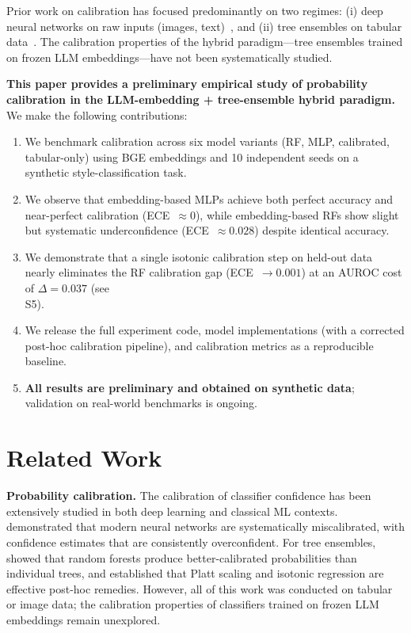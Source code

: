 \documentclass[11pt]{article}
\begin{document}
Prior work on calibration has focused predominantly on two regimes: (i) deep neural networks on raw inputs (images, text)~\cite{guo2017calibration}, and (ii) tree ensembles on tabular data~\cite{niculescu2005predicting,bostrom2008calibration}. The calibration properties of the hybrid paradigm---tree ensembles trained on frozen LLM embeddings---have not been systematically studied.

\textbf{This paper provides a preliminary empirical study of probability calibration in the LLM-embedding + tree-ensemble hybrid paradigm.} We make the following contributions:

\begin{enumerate}[leftmargin=*,nosep]
 \item We benchmark calibration across six model variants (RF, MLP, calibrated, tabular-only) using BGE embeddings and 10 independent seeds on a synthetic style-classification task.
 \item We observe that embedding-based MLPs achieve both perfect accuracy and near-perfect calibration (ECE~${\approx}0$), while embedding-based RFs show slight but systematic underconfidence (ECE~${\approx}0.028$) despite identical accuracy.
 \item We demonstrate that a single isotonic calibration step on held-out data nearly eliminates the RF calibration gap (ECE~${\rightarrow}0.001$) at an AUROC cost of $\Delta = 0.037$ (see \\S5).
 \item We release the full experiment code, model implementations (with a corrected post-hoc calibration pipeline), and calibration metrics as a reproducible baseline.
 \item \textbf{All results are preliminary and obtained on synthetic data}; validation on real-world benchmarks is ongoing.
\end{enumerate}

\section{Related Work}

\textbf{Probability calibration.} The calibration of classifier confidence has been extensively studied in both deep learning and classical ML contexts. \citet{guo2017calibration} demonstrated that modern neural networks are systematically miscalibrated, with confidence estimates that are consistently overconfident. For tree ensembles, \citet{niculescu2005predicting} showed that random forests produce better-calibrated probabilities than individual trees, and \citet{bostrom2008calibration} established that Platt scaling and isotonic regression are effective post-hoc remedies. However, all of this work was conducted on tabular or image data; the calibration properties of classifiers trained on frozen LLM embeddings remain unexplored.
\end{document}
